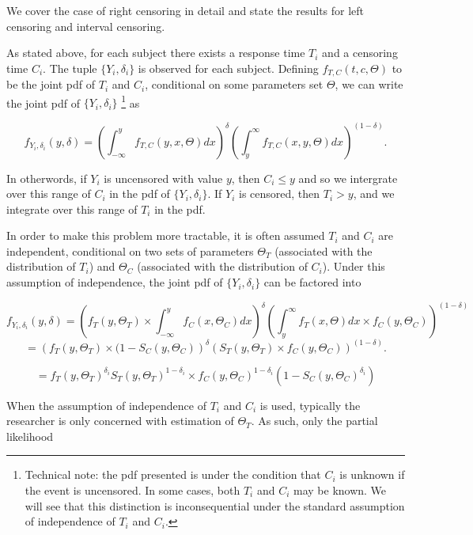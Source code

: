 \documentclass[a4paper]{article}
\begin{document}
  We cover the case of right censoring in detail and state the results for left censoring and interval censoring. 
  
  As stated above, for each subject there exists a response time $T_i$ and a censoring time $C_i$. The tuple $\{Y_i, \delta_i\}$ is observed for each subject. Defining $f_{T, C}(t, c, \Theta)$ to be the joint pdf of $T_i$ and $C_i$, conditional on some parameters set $\Theta$, we can write the joint pdf of $\{Y_i, \delta_i\}$ 
  \footnote{Technical note: the pdf presented is under the condition that $C_i$ is unknown if the event is uncensored. In some cases, both $T_i$ and $C_i$ may be known. We will see that this distinction is inconsequential under the standard assumption of independence of $T_i$ and $C_i$.} as

  
  \[
  f_{Y_i, \delta_i}(y, \delta) = \left( \int_{-\infty}^{y} f_{T, C} (y, x, \Theta) dx \right) ^ {\delta}
  \left( \int_{y}^{\infty} f_{T, C} (x, y, \Theta) dx \right) ^{(1-\delta)}.
  \]

  In otherwords, if $Y_i$ is uncensored with value $y$, then $C_i \leq y$ and so we intergrate over this range of $C_i$ in the pdf of $\{Y_i, \delta_i\}$. If $Y_i$ is censored, then $T_i > y$, and we integrate over this range of $T_i$ in the pdf. 
  
  In order to make this problem more tractable, it is often assumed $T_i$ and $C_i$ are independent, conditional on two sets of parameters $\Theta_T$ (associated with the distribution of $T_i$) and $\Theta_C$ (associated with the distribution of $C_i$). Under this assumption of independence, the joint pdf of $\{Y_i, \delta_i\}$ can be factored into 
  
  \[
  f_{Y_i, \delta_i}(y, \delta) = 
  \left( f_{T} (y, \Theta_T) \times \int_{-\infty}^{y} f_{C}(x, \Theta_C) dx\right) ^ {\delta}
  \left( \int_{y}^{\infty} f_{T} (x, \Theta) dx \times f_{C}(y, \Theta_C) \right) ^{(1-\delta)}
  \]
  \[
  = 
  \left( f_{T} (y, \Theta_T) \times (1 - S_C(y, \Theta_{C}) \right) ^ {\delta}
  \left( S_T(y, \Theta_{T}) \times f_{C}(y, \Theta_C) \right) ^{(1-\delta)}.
  \]
  
  \[
  =
  f_{T}(y, \Theta_T) ^{\delta_i} S_{T}(y, \Theta_T) ^{1 - \delta_i} 
  \times
  f_C(y, \Theta_C)^{1 - \delta_i} (1 - S_C(y, \Theta_C) ^{\delta_i} )
  \]

  
  When the assumption of independence of $T_i$ and $C_i$ is used, typically the researcher is only concerned with estimation of $\Theta_T$. As such, only the partial likelihood 
  
\end{document}
